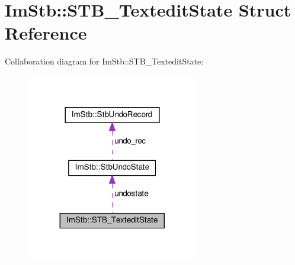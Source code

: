 \hypertarget{structImStb_1_1STB__TexteditState}{}\section{Im\+Stb\+:\+:S\+T\+B\+\_\+\+Textedit\+State Struct Reference}
\label{structImStb_1_1STB__TexteditState}


Collaboration diagram for Im\+Stb\+:\+:S\+T\+B\+\_\+\+Textedit\+State\+:\nopagebreak
\begin{figure}[H]
\begin{center}
\leavevmode
\includegraphics[width=212pt]{structImStb_1_1STB__TexteditState__coll__graph}
\end{center}
\end{figure}
